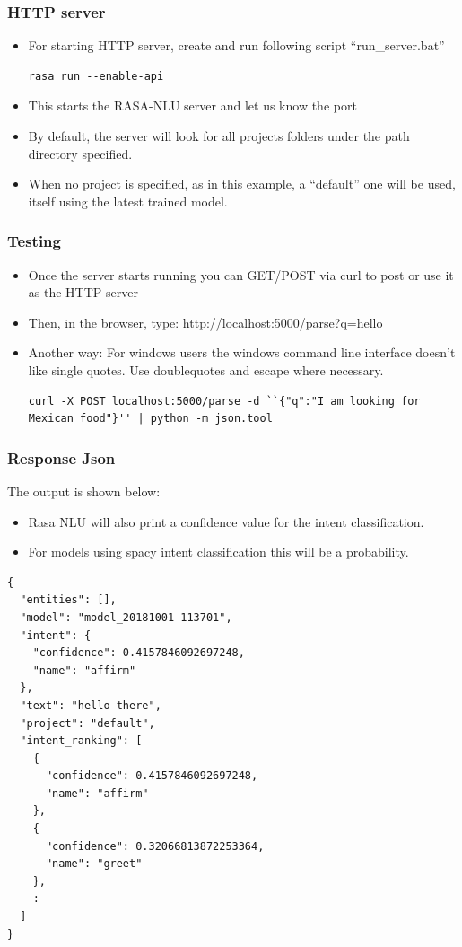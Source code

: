 \begin{frame}[fragile]\frametitle{HTTP server}
\begin{itemize}
\item For starting HTTP server, create and run following script ``run\_server.bat''
\begin{lstlisting}
rasa run --enable-api
\end{lstlisting}
\item This starts the RASA-NLU server and let us know the port
\item By default, the server will look for all projects folders under the path directory specified. 
\item When no project is specified, as in this example, a ``default'' one will be used, itself using the latest trained model.
\end{itemize}
\end{frame}



 \begin{frame}[fragile]\frametitle{Testing}
\begin{itemize}
\item Once the server starts running you can GET/POST via curl to post or use it as the HTTP server
\item Then, in the browser, type: http://localhost:5000/parse?q=hello%
\item Another way: For windows users the windows command line interface doesn't like single quotes. Use doublequotes and escape where necessary.
\begin{lstlisting}
curl -X POST localhost:5000/parse -d ``{"q":"I am looking for Mexican food"}'' | python -m json.tool
\end{lstlisting}
\end{itemize}
\end{frame}

 \begin{frame}[fragile]\frametitle{Response Json}
The output is shown below:
\begin{itemize}
\item Rasa NLU will also print a confidence value for the intent classification.
\item For models using spacy intent classification this will be a probability.
\end{itemize}
\scriptsize
\begin{lstlisting}
{
  "entities": [],
  "model": "model_20181001-113701",
  "intent": {
    "confidence": 0.4157846092697248,
    "name": "affirm"
  },
  "text": "hello there",
  "project": "default",
  "intent_ranking": [
    {
      "confidence": 0.4157846092697248,
      "name": "affirm"
    },
    {
      "confidence": 0.32066813872253364,
      "name": "greet"
    },
    :
  ]
}
\end{lstlisting}
\end{frame}

